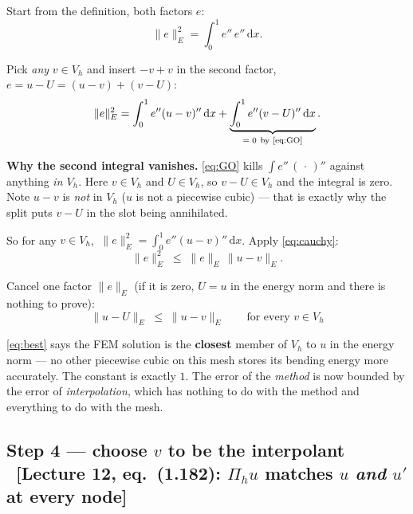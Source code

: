 \documentclass[11pt]{article}
\newcommand{\dx}{\,\mathrm{d}x}
\newcommand{\norm}[1]{\lVert #1\rVert}
\newcommand{\src}[1]{{\small\color{black!55}\textsf{[#1]}}}
\begin{document}
\begin{steps}
\item Start from the definition, both factors $e$:
\[
  \norm{e}_{E}^{2}=\int_{0}^{1}e''\,e''\dx .
\]
\item Pick \emph{any} $v\in V_{h}$ and insert $-v+v$ in the second factor,
      $e=u-U=(u-v)+(v-U)$:
\begin{equation}\label{eq:split}
  \norm{e}_{E}^{2}
  =\int_{0}^{1}e''(u-v)''\dx
  +\underbrace{\int_{0}^{1}e''(v-U)''\dx}_{=\;0\ \text{by \eqref{eq:GO}}} .
\end{equation}
\item \textbf{Why the second integral vanishes.}  \eqref{eq:GO} kills
      $\int e''\,(\,\cdot\,)''$ against anything \emph{in $V_{h}$}.  Here
      $v\in V_{h}$ and $U\in V_{h}$, so $v-U\in V_{h}$ and the integral is zero.
      Note $u-v$ is \emph{not} in $V_{h}$ ($u$ is not a piecewise cubic) ---
      that is exactly why the split puts $v-U$ in the slot being annihilated.
\item So for any $v\in V_{h}$, $\ \norm{e}_{E}^{2}=\int_{0}^{1}e''(u-v)''\dx$.
      Apply \eqref{eq:cauchy}:
\[
  \norm{e}_{E}^{2}\;\le\;\norm{e}_{E}\,\norm{u-v}_{E}.
\]
\item Cancel one factor $\norm{e}_{E}$ (if it is zero, $U=u$ in the energy norm
      and there is nothing to prove):
\begin{equation}\label{eq:best}
  \boxed{\;\norm{u-U}_{E}\;\le\;\norm{u-v}_{E}\qquad\text{for every }v\in V_{h}\;}
\end{equation}
\end{steps}

\medskip
{\small\color{black!60}\eqref{eq:best} says the FEM solution is the
\textbf{closest} member of $V_{h}$ to $u$ in the energy norm --- no other
piecewise cubic on this mesh stores its bending energy more accurately.  The
constant is exactly $1$.  The error of the \emph{method} is now bounded by the
error of \emph{interpolation}, which has nothing to do with the method and
everything to do with the mesh.}

\subsection*{Step 4 --- choose $v$ to be the interpolant
  \ \src{Lecture 12, eq.~(1.182): $\Pi_h u$ matches $u$ \emph{and} $u'$ at every
         node}}
\end{document}
